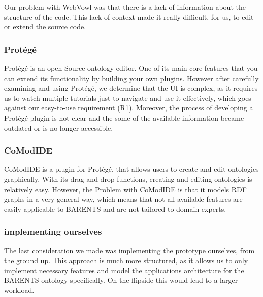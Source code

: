 \documentclass[sigconf, nonacm]{acmart}
\begin{document}
            Our problem with WebVowl was that there is a lack of information about the structure of the code.
            This lack of context made it really difficult, for us, to edit or extend the source code.
        \subsubsection{Protégé}
            Protégé is an open Source ontology editor\cite{musen2015protege}. One of its main core features that you can extend its functionality by building your own plugins. However after carefully examining and using Protégé, we determine that the UI is complex, as it requires us to watch multiple tutorials just to navigate and use it effectively, which goes against our easy-to-use requirement (R1).
            Moreover, the process of developing a Protégé plugin is not clear and the some of the available information became outdated or is no longer accessible. 
        \subsubsection{CoModIDE}
            CoModIDE is a plugin for Protégé, that allows users to create and edit ontologies graphically\cite{shimizu2019comodide}. With its drag-and-drop functions, creating and editing ontologies is relatively easy. However, the Problem with CoModIDE is that it models RDF graphs in a very general way, which means that not all available features are easily applicable to BARENTS and are not tailored to domain experts.  
        \subsubsection{implementing ourselves}
            The last consideration we made was implementing the prototype ourselves, from the ground up. 
            This approach is much more structured, as it allows us to only implement necessary features and model the applications architecture for the BARENTS ontology specifically. 
            On the flipside this would lead to a larger workload. 
\end{document}
